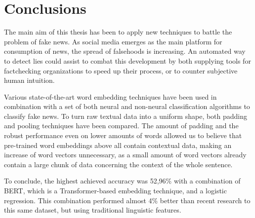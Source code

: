 \section{Conclusions}
The main aim of this thesis has been to apply new techniques to battle the problem of fake news.
As social media emerges as the main platform for consumption of news, the spread of falsehoods is increasing. 
An automated way to detect lies could assist to combat this development by both supplying tools for factchecking organizations to speed up their process, or to counter subjective human intuition.

Various state-of-the-art word embedding techniques have been used in combination with a set of both neural and non-neural classification algorithms to classify fake news.
To turn raw textual data into a uniform shape, both padding and pooling techniques have been compared. 
The amount of padding and the robust performance even on lower amounts of words allowed us to believe that pre-trained word embeddings above all contain contextual data, making an increase of word vectors unnecessary, as a small amount of word vectors already contain a large chunk of data concerning the context of the whole sentence. 

To conclude, the highest achieved accuracy was 52,96\% with a combination of BERT, which is a Transformer-based embedding technique, and a logistic regression.
This combination performed almost 4\% better than recent research to this same dataset, but using traditional linguistic features. 

\pagebreak